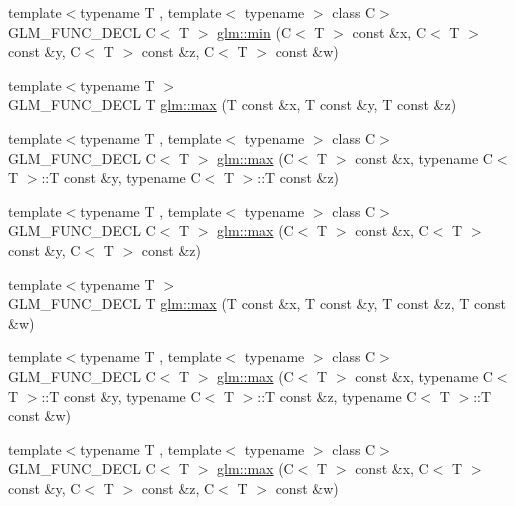 \begin{DoxyCompactItemize}
\item 
{\footnotesize template$<$typename T , template$<$ typename $>$ class C$>$ }\\G\-L\-M\-\_\-\-F\-U\-N\-C\-\_\-\-D\-E\-C\-L C$<$ T $>$ \hyperlink{group__gtx__extented__min__max_ga7471ea4159eed8dd9ea4ac5d46c2fead}{glm\-::min} (C$<$ T $>$ const \&x, C$<$ T $>$ const \&y, C$<$ T $>$ const \&z, C$<$ T $>$ const \&w)
\item 
{\footnotesize template$<$typename T $>$ }\\G\-L\-M\-\_\-\-F\-U\-N\-C\-\_\-\-D\-E\-C\-L T \hyperlink{group__gtx__extented__min__max_ga04991ccb9865c4c4e58488cfb209ce69}{glm\-::max} (T const \&x, T const \&y, T const \&z)
\item 
{\footnotesize template$<$typename T , template$<$ typename $>$ class C$>$ }\\G\-L\-M\-\_\-\-F\-U\-N\-C\-\_\-\-D\-E\-C\-L C$<$ T $>$ \hyperlink{group__gtx__extented__min__max_gae1b7bbe5c91de4924835ea3e14530744}{glm\-::max} (C$<$ T $>$ const \&x, typename C$<$ T $>$\-::T const \&y, typename C$<$ T $>$\-::T const \&z)
\item 
{\footnotesize template$<$typename T , template$<$ typename $>$ class C$>$ }\\G\-L\-M\-\_\-\-F\-U\-N\-C\-\_\-\-D\-E\-C\-L C$<$ T $>$ \hyperlink{group__gtx__extented__min__max_gaf832e9d4ab4826b2dda2fda25935a3a4}{glm\-::max} (C$<$ T $>$ const \&x, C$<$ T $>$ const \&y, C$<$ T $>$ const \&z)
\item 
{\footnotesize template$<$typename T $>$ }\\G\-L\-M\-\_\-\-F\-U\-N\-C\-\_\-\-D\-E\-C\-L T \hyperlink{group__gtx__extented__min__max_ga78e04a0cef1c4863fcae1a2130500d87}{glm\-::max} (T const \&x, T const \&y, T const \&z, T const \&w)
\item 
{\footnotesize template$<$typename T , template$<$ typename $>$ class C$>$ }\\G\-L\-M\-\_\-\-F\-U\-N\-C\-\_\-\-D\-E\-C\-L C$<$ T $>$ \hyperlink{group__gtx__extented__min__max_ga7cca8b53cfda402040494cdf40fbdf4a}{glm\-::max} (C$<$ T $>$ const \&x, typename C$<$ T $>$\-::T const \&y, typename C$<$ T $>$\-::T const \&z, typename C$<$ T $>$\-::T const \&w)
\item 
{\footnotesize template$<$typename T , template$<$ typename $>$ class C$>$ }\\G\-L\-M\-\_\-\-F\-U\-N\-C\-\_\-\-D\-E\-C\-L C$<$ T $>$ \hyperlink{group__gtx__extented__min__max_gaacffbc466c2d08c140b181e7fd8a4858}{glm\-::max} (C$<$ T $>$ const \&x, C$<$ T $>$ const \&y, C$<$ T $>$ const \&z, C$<$ T $>$ const \&w)
\end{DoxyCompactItemize}


